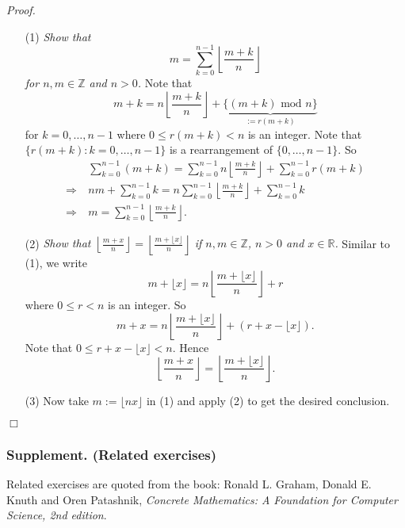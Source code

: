 \documentclass{article}
\begin{document}
\emph{Proof.}
\begin{enumerate}
\item[(1)]
  \emph{Show that
  \[
    m = \sum_{k=0}^{n-1} \left\lfloor \frac{m + k}{n} \right\rfloor
  \]
  for $n, m \in \mathbb{Z}$ and $n > 0$.}
  Note that
  \[
    m + k
    = n \left\lfloor \frac{m + k}{n} \right\rfloor
        + \underbrace{\{ (m + k) \text{ mod } n \}}_{:= r(m+k)}
  \]
  for $k = 0, \ldots, n-1$ where $0 \leq r(m+k) < n$ is an integer.
  Note that $\{ r(m+k) : k = 0, \ldots, n-1 \}$ is a rearrangement of $\{ 0, \ldots, n-1 \}$.
  So
  \begin{align*}
    &\: \sum_{k=0}^{n-1} (m+k)
    = \sum_{k=0}^{n-1} n \left\lfloor \frac{m + k}{n} \right\rfloor + \sum_{k=0}^{n-1} r(m+k) \\
    \Longrightarrow &\:
    nm + \sum_{k=0}^{n-1} k
    = n \sum_{k=0}^{n-1} \left\lfloor \frac{m + k}{n} \right\rfloor + \sum_{k=0}^{n-1} k \\
    \Longrightarrow &\:
    m = \sum_{k=0}^{n-1} \left\lfloor \frac{m + k}{n} \right\rfloor.
  \end{align*}

\item[(2)]
  \emph{Show that $\left\lfloor \frac{m + x}{n} \right\rfloor
  = \left\lfloor \frac{m + \lfloor x \rfloor}{n} \right\rfloor$
  if $n, m \in \mathbb{Z}$, $n > 0$ and $x \in \mathbb{R}$.}
  Similar to (1), we write
  \[
    m + \lfloor x \rfloor
    = n \left\lfloor \frac{m + \lfloor x \rfloor}{n} \right\rfloor + r
  \]
  where $0 \leq r < n$ is an integer.
  So
  \[
    m + x
    = n \left\lfloor \frac{m + \lfloor x \rfloor}{n} \right\rfloor
    + (r + x - \lfloor x \rfloor).
  \]
  Note that $0 \leq r + x - \lfloor x \rfloor < n$.
  Hence
  \[
    \left\lfloor \frac{m + x}{n} \right\rfloor
    = \left\lfloor \frac{m + \lfloor x \rfloor}{n} \right\rfloor.
  \]

\item[(3)]
  Now take $m := \lfloor nx \rfloor$ in (1) and apply (2) to get the desired conclusion.
\end{enumerate}
$\Box$ \\






\subsubsection*{Supplement. (Related exercises)}
Related exercises are quoted from the book:
Ronald L. Graham, Donald E. Knuth and Oren Patashnik,
\emph{Concrete Mathematics: A Foundation for Computer Science, 2nd edition}.
\end{document}
